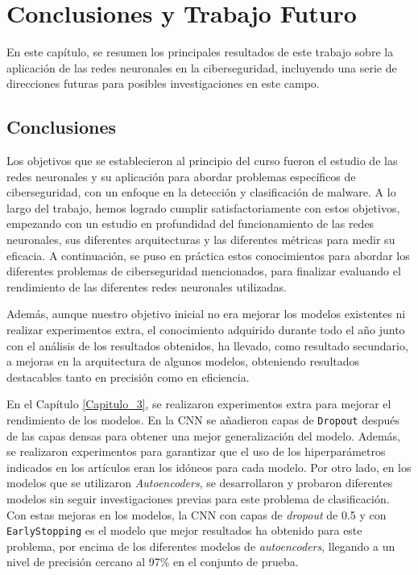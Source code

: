 \chapter{Conclusiones y Trabajo Futuro} \label{Capitulo_5}

En este capítulo, se resumen los principales resultados de este trabajo sobre la aplicación de las redes neuronales en la ciberseguridad, incluyendo una serie de direcciones futuras para posibles investigaciones en este campo.


\section{Conclusiones}

Los objetivos que se establecieron al principio del curso fueron el estudio de las redes neuronales y su aplicación para abordar problemas específicos de ciberseguridad, con un enfoque en la detección y clasificación de malware.  A lo largo del trabajo, hemos logrado cumplir satisfactoriamente con estos objetivos, empezando con un estudio en profundidad del funcionamiento de las redes neuronales, sus diferentes arquitecturas y las diferentes métricas para medir su eficacia. A continuación, se puso en práctica estos conocimientos para abordar los diferentes problemas de ciberseguridad mencionados, para finalizar evaluando el rendimiento de las diferentes redes neuronales utilizadas.

Además, aunque nuestro objetivo inicial no era mejorar los modelos existentes ni realizar experimentos extra, el conocimiento adquirido durante todo el año junto con el análisis de los resultados obtenidos, ha llevado, como resultado secundario, a mejoras en la arquitectura de algunos modelos, obteniendo resultados destacables tanto en precisión como en eficiencia.

En el Capítulo \ref{Capitulo_3}, se realizaron  experimentos extra para mejorar el rendimiento de los modelos. En la CNN se añadieron capas de \lstinline|Dropout| después de las capas densas para obtener una mejor generalización del modelo. Además, se realizaron experimentos para garantizar que el uso de los hiperparámetros indicados en los artículos eran los idóneos para cada modelo. Por otro lado, en los modelos que se utilizaron \textit{Autoencoders}, se desarrollaron y probaron diferentes modelos sin seguir investigaciones previas para este problema de clasificación. Con estas mejoras en los modelos, la CNN con capas de \textit{dropout} de 0.5 y con \lstinline|EarlyStopping| es el modelo que mejor resultados ha obtenido para este problema, por encima de los diferentes modelos de \textit{autoencoders}, llegando a un nivel de precisión cercano al 97\% en el conjunto de prueba. 

